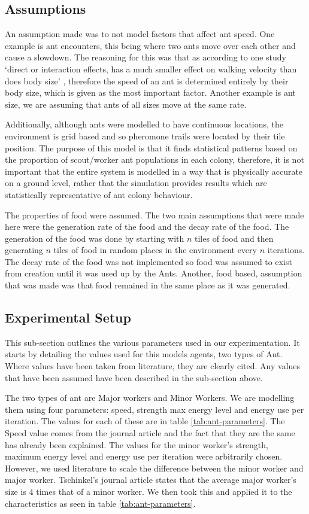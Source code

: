  \subsection{Assumptions}
An assumption made was to not model factors that affect ant speed. One example is ant encounters, this being where two ants move over each other and cause a slowdown. The reasoning for this was that as according to one study `direct or interaction effects, has a much smaller effect on walking velocity than does body size' \cite{Burd2003}, therefore the speed of an ant is determined entirely by their body size, which is given as the most important factor. Another example is ant size, we are assuming that ants of all sizes move at the same rate.\par
Additionally, although ants were modelled to have continuous locations, the environment is grid based and so pheromone trails were located by their tile position. The purpose of this model is that it finds statistical patterns based on the proportion of scout/worker ant populations in each colony, therefore, it is not important that the entire system is modelled in a way that is physically accurate on a ground level, rather that the simulation provides results which are statistically representative of ant colony behaviour.\par 
The properties of food were assumed. The two main assumptions that were made here were the generation rate of the food and the decay rate of the food. The generation of the food was done by starting with $n$ tiles of food and then generating $n$ tiles of food in random places in the environment every $n$ iterations. The decay rate of the food was not implemented so food was assumed to exist from creation until it was used up by the Ants. Another, food based, assumption that was made was that food remained in the same place as it was generated.\par
 
 \subsection{Experimental Setup}
 This sub-section outlines the various parameters used in our experimentation. It starts by detailing the values used for this models agents, two types of Ant. Where values have been taken from literature, they are clearly cited. Any values that have been assumed have been described in the sub-section above.\par
The two types of ant are Major workers and Minor Workers. We are modelling them using four parameters: speed, strength max energy level and energy use per iteration. The values for each of these are in table \ref{tab:ant-parameters}. The Speed value comes from the journal article \cite{Burd2003} and the fact that they are the same has already been explained. The values for the minor worker's strength, maximum energy level and energy use per iteration were arbitrarily chosen. However, we used literature to scale the difference between the minor worker and major worker. Tschinkel's journal article \cite{Tschinkel1988} states that the average major worker's size is 4 times that of a minor worker. We then took this and applied it to the characteristics as seen in table \ref{tab:ant-parameters}.

